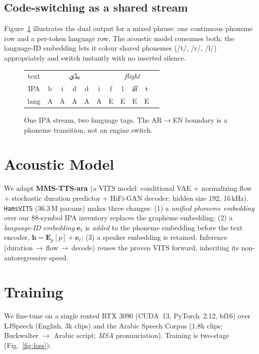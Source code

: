 \documentclass[10pt,twocolumn]{article}
\newcommand{\ar}[1]{\textarabic{#1}}        %
\newcommand{\ipa}[1]{{\ipafont #1}}          %
\begin{document}
\subsection{Code-switching as a shared stream}
Figure~\ref{fig:cs} illustrates the dual output for a mixed phrase: one continuous
phoneme row and a per-token language row. The acoustic model consumes both; the
language-ID embedding lets it colour shared phonemes (/t/, /r/, /l/) appropriately and
switch instantly with no inserted silence.

\begin{figure}[t]\centering
\footnotesize
\setlength{\tabcolsep}{3pt}
\begin{tabular}{@{}c|ccccc|ccccc@{}}
text & \multicolumn{5}{c|}{\ar{بدّي}} & \multicolumn{5}{c}{\emph{flight}}\\
IPA & \ipa{b}&\ipa{i}&\ipa{d}&\ipa{d}&\ipa{i} & \ipa{f}&\ipa{l}&\ipa{a͡ɪ}&\ipa{t}&\\
lang & A&A&A&A&A & E&E&E&E&\\
\end{tabular}
\caption{One IPA stream, two language tags. The AR$\rightarrow$EN boundary is a phoneme
transition, not an engine switch.}
\label{fig:cs}
\end{figure}

\section{Acoustic Model}\label{sec:model}
We adapt \textbf{MMS-TTS-ara} (a VITS model: conditional VAE + normalizing flow +
stochastic duration predictor + HiFi-GAN decoder; hidden size 192, 16\,kHz). \texttt{HamsVITS}
(36.3\,M params) makes three changes: (1) a \emph{unified phoneme embedding} over our
88-symbol IPA inventory replaces the grapheme embedding; (2) a \emph{language-ID embedding}
$\mathbf{e}_\ell$ is \emph{added} to the phoneme embedding before the text encoder,
$\mathbf{h}=\mathbf{E}_p[p]+\mathbf{e}_\ell$; (3) a speaker embedding is retained.
Inference (duration\,$\rightarrow$\,flow\,$\rightarrow$\,decode) reuses the proven VITS
forward, inheriting its non-autoregressive speed.

\section{Training}\label{sec:train}
We fine-tune on a single rented RTX 3090 (CUDA~13, PyTorch~2.12, bf16) over LJSpeech
(English, 3k clips) and the Arabic Speech Corpus (1.8k clips; Buckwalter
$\rightarrow$ Arabic script; \emph{MSA} pronunciation). Training is two-stage
(Fig.~\ref{fig:loss}):
\end{document}
